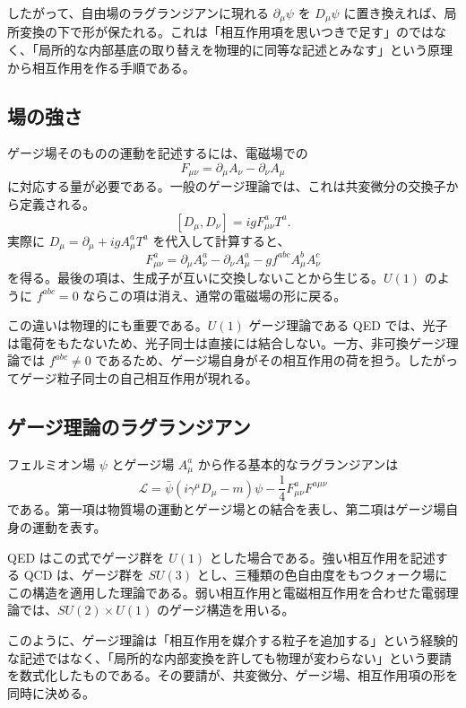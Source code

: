 したがって、自由場のラグランジアンに現れる $\partial_\mu\psi$ を $D_\mu\psi$ に置き換えれば、局所変換の下で形が保たれる。これは「相互作用項を思いつきで足す」のではなく、「局所的な内部基底の取り替えを物理的に同等な記述とみなす」という原理から相互作用を作る手順である。

\subsection{場の強さ}
ゲージ場そのものの運動を記述するには、電磁場での
\[
F_{\mu\nu}=\partial_\mu A_\nu-\partial_\nu A_\mu
\]
に対応する量が必要である。一般のゲージ理論では、これは共変微分の交換子から定義される。
\[
[D_\mu,D_\nu]=igF_{\mu\nu}^aT^a.
\]
実際に $D_\mu=\partial_\mu+igA_\mu^aT^a$ を代入して計算すると、
\[
F_{\mu\nu}^a
=
\partial_\mu A_\nu^a-\partial_\nu A_\mu^a
-gf^{abc}A_\mu^bA_\nu^c
\]
を得る。最後の項は、生成子が互いに交換しないことから生じる。$U(1)$ のように $f^{abc}=0$ ならこの項は消え、通常の電磁場の形に戻る。

この違いは物理的にも重要である。$U(1)$ ゲージ理論である QED では、光子は電荷をもたないため、光子同士は直接には結合しない。一方、非可換ゲージ理論では $f^{abc}\neq0$ であるため、ゲージ場自身がその相互作用の荷を担う。したがってゲージ粒子同士の自己相互作用が現れる。

\subsection{ゲージ理論のラグランジアン}
フェルミオン場 $\psi$ とゲージ場 $A_\mu^a$ から作る基本的なラグランジアンは
\[
\mathcal{L}
=
\bar{\psi}(i\gamma^\mu D_\mu-m)\psi
-\frac{1}{4}F_{\mu\nu}^aF^{a\mu\nu}
\]
である。第一項は物質場の運動とゲージ場との結合を表し、第二項はゲージ場自身の運動を表す。

QED はこの式でゲージ群を $U(1)$ とした場合である。強い相互作用を記述する QCD は、ゲージ群を $SU(3)$ とし、三種類の色自由度をもつクォーク場にこの構造を適用した理論である。弱い相互作用と電磁相互作用を合わせた電弱理論では、$SU(2)\times U(1)$ のゲージ構造を用いる。

このように、ゲージ理論は「相互作用を媒介する粒子を追加する」という経験的な記述ではなく、「局所的な内部変換を許しても物理が変わらない」という要請を数式化したものである。その要請が、共変微分、ゲージ場、相互作用項の形を同時に決める。
